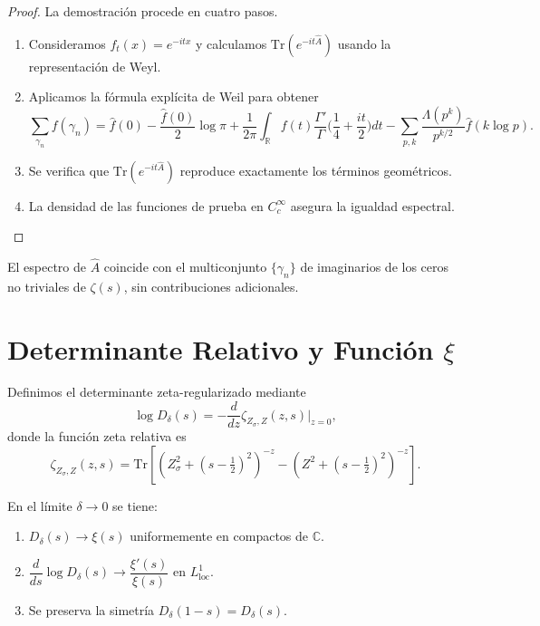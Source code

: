 \begin{proof}
La demostración procede en cuatro pasos.
\begin{enumerate}
  \item Consideramos $f_t(x) = e^{-itx}$ y calculamos $\mathrm{Tr}(e^{-it \widehat{A}})$ usando la representación de Weyl.
  \item Aplicamos la fórmula explícita de Weil para obtener
  \[
    \sum_{\gamma_n} f(\gamma_n) = \widehat{f}(0) - \frac{\widehat{f}(0)}{2}\log \pi + \frac{1}{2\pi}\int_{\mathbb{R}} f(t) \frac{\Gamma'}{\Gamma}\Big(\frac{1}{4} + \frac{it}{2}\Big) dt - \sum_{p,k} \frac{\Lambda(p^k)}{p^{k/2}}\widehat{f}(k \log p).
  \]
  \item Se verifica que $\mathrm{Tr}(e^{-it \widehat{A}})$ reproduce exactamente los términos geométricos.
  \item La densidad de las funciones de prueba en $C_c^\infty$ asegura la igualdad espectral.
\end{enumerate}
\end{proof}

\begin{corollary}\label{cor:correspondencia-espectral-latex}
El espectro de $\widehat{A}$ coincide con el multiconjunto $\{\gamma_n\}$ de imaginarios de los ceros no triviales de $\zeta(s)$, sin contribuciones adicionales.
\end{corollary}

\section{Determinante Relativo y Función $\xi$}

Definimos el determinante zeta-regularizado mediante
\[
  \log D_\delta(s) = -\frac{d}{dz} \zeta_{Z_\sigma, Z}(z,s) \big|_{z=0},
\]
donde la función zeta relativa es
\[
  \zeta_{Z_\sigma, Z}(z,s) = \mathrm{Tr}\left[(Z_\sigma^2 + (s-\tfrac{1}{2})^2)^{-z} - (Z^2 + (s-\tfrac{1}{2})^2)^{-z}\right].
\]

\begin{theorem}\label{thm:determinante-latex}
En el límite $\delta \to 0$ se tiene:
\begin{enumerate}
  \item $D_\delta(s) \to \xi(s)$ uniformemente en compactos de $\mathbb{C}$.
  \item $\dfrac{d}{ds} \log D_\delta(s) \to \dfrac{\xi'(s)}{\xi(s)}$ en $L^1_{\text{loc}}$.
  \item Se preserva la simetría $D_\delta(1-s) = D_\delta(s)$.
\end{enumerate}
\end{theorem}

